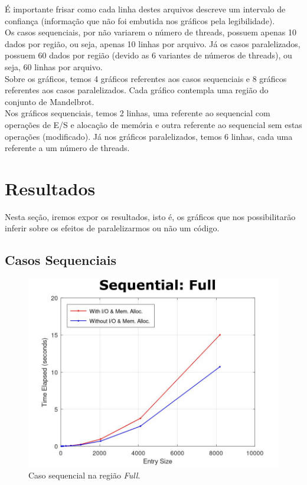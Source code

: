 \documentclass[a4paper, 12pt]{article}
\begin{document}
É importante frisar como cada linha destes arquivos descreve um intervalo de confiança (informação que não foi embutida nos gráficos pela legibilidade).\\

Os casos sequenciais, por não variarem o número de threads, possuem apenas 10 dados por região, ou seja, apenas 10 linhas por arquivo. Já os casos paralelizados, possuem 60 dados por região (devido as 6 variantes de números de threads), ou seja, 60 linhas por arquivo.\\

Sobre os gráficos, temos 4 gráficos referentes aos casos sequenciais e 8 gráficos referentes aos casos paralelizados. Cada gráfico contempla uma região do conjunto de Mandelbrot.\\

Nos gráficos sequenciais, temos 2 linhas, uma referente ao sequencial com operações de E/S e alocação de memória e outra referente ao sequencial sem estas operações (modificado). Já nos gráficos paralelizados, temos 6 linhas, cada uma referente a um número de threads.\\

\section{Resultados}

Nesta seção, iremos expor os resultados, isto é, os gráficos que nos possibilitarão inferir sobre os efeitos de paralelizarmos ou não um código.\\

\subsection{Casos Sequenciais}

\begin{figure}[H]
	\centering
	\includegraphics[scale=0.45]{seq_full}
	\caption{Caso sequencial na região \textit{Full}.}
\end{figure}
\end{document}
